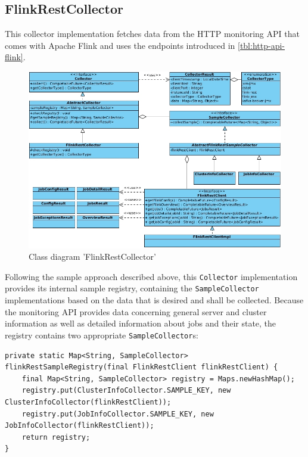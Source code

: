 \subsection{FlinkRestCollector}

This collector implementation fetches data from the HTTP monitoring API that comes with Apache Flink and uses the endpoints
introduced in \autoref{tbl:http-api-flink}.

\begin{figure}[H]
	\centering
	\includegraphics[width=1.0\textwidth]{../uml/class-flink-rest-collector.jpg}
	\caption{Class diagram 'FlinkRestCollector'}
	\label{class-diagram-flink-rest-collector}
\end{figure}

Following the sample approach described above, this \verb|Collector| implementation provides its internal sample registry,
containing the \verb|SampleCollector| implementations based on the data that is desired and shall be collected. Because the monitoring API provides data concerning
general server and cluster information as well as detailed information about jobs and their state, the registry contains
two appropriate \verb|SampleCollector|s:

\begin{lstlisting}[caption={"FlinkRestCollector" Sample registry}, captionpos=b, label={lst:flink-rest-collector-sample-registry}]
private static Map<String, SampleCollector> flinkRestSampleRegistry(final FlinkRestClient flinkRestClient) {
    final Map<String, SampleCollector> registry = Maps.newHashMap();
    registry.put(ClusterInfoCollector.SAMPLE_KEY, new ClusterInfoCollector(flinkRestClient));
    registry.put(JobInfoCollector.SAMPLE_KEY, new JobInfoCollector(flinkRestClient));
    return registry;
}
\end{lstlisting}

